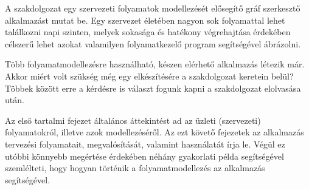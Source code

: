 
A szakdolgozat egy szervezeti folyamatok modellezését elősegítő gráf szerkesztő alkalmazást mutat be. Egy szervezet életében nagyon sok folyamattal lehet találkozni napi szinten, melyek sokasága és hatékony végrehajtása érdekében célszerű lehet azokat valamilyen folyamatkezelő program segítségével ábrázolni.

Több folyamatmodellezésre használható, készen elérhető alkalmazás létezik már. Akkor miért volt szükség még egy elkészítésére a szakdolgozat keretein belül? Többek között erre a kérdésre is választ fogunk kapni a szakdolgozat elolvasása után.

Az első tartalmi fejezet általános áttekintést ad az üzleti (szervezeti) folyamatokról, illetve azok modellezéséről. Az ezt követő fejezetek az alkalmazás tervezési folyamatait, megvalósítását, valamint használatát írja le. Végül ez utóbbi könnyebb megértése érdekében néhány gyakorlati példa segítségével szemlélteti, hogy hogyan történik a folyamatmodellezés az alkalmazás segítségével.